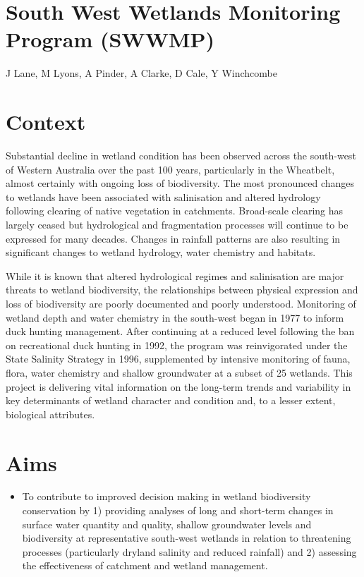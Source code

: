 \documentclass[version=last,
    paper=a4, %
    10pt, %
    usenames,
    dvipsnames,
    oneside, %
    headings=openany, %
    DIV=15 %
]{scrbook}
\begin{document}
\section*{South West Wetlands Monitoring Program (SWWMP)
}

J Lane, M Lyons, A Pinder, A Clarke, D Cale, Y Winchcombe


\section*{Context}
Substantial decline in wetland condition has been observed across the
south-west of Western Australia over the past 100 years, particularly in
the Wheatbelt, almost certainly with ongoing loss of biodiversity. The
most pronounced changes to wetlands have been associated with
salinisation and altered hydrology following clearing of native
vegetation in catchments. Broad-scale clearing has largely ceased but
hydrological and fragmentation processes will continue to be expressed
for many decades. Changes in rainfall patterns are also resulting in
significant changes to wetland hydrology, water chemistry and habitats.

While it is known that altered hydrological regimes and salinisation are
major threats to wetland biodiversity, the relationships between
physical expression and loss of biodiversity are poorly documented and
poorly understood. Monitoring of wetland depth and water chemistry in
the south-west began in 1977 to inform duck hunting management. After
continuing at a reduced level following the ban on recreational duck
hunting in 1992, the program was reinvigorated under the State Salinity
Strategy in 1996, supplemented by intensive monitoring of fauna, flora,
water chemistry and shallow groundwater at a subset of 25 wetlands. This
project is delivering vital information on the long-term trends and
variability in key determinants of wetland character and condition and,
to a lesser extent, biological attributes.



\section*{Aims}
\begin{itemize}
\itemsep1pt\parskip0pt
\item
  To contribute to improved decision making in wetland biodiversity
  conservation by 1) providing analyses of long and short-term changes
  in surface water quantity and quality, shallow groundwater levels and
  biodiversity at representative south-west wetlands in relation to
  threatening processes (particularly dryland salinity and reduced
  rainfall) and 2) assessing the effectiveness of catchment and wetland
  management.
\end{itemize}
\end{document}
